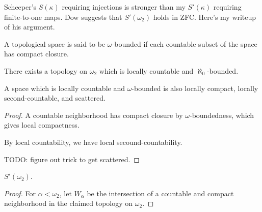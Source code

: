 \documentclass[11pt]{article}
\begin{document}
  \begin{remark}
    Scheeper's \(S(\kappa)\) requiring injections is stronger than my
    \(S'(\kappa)\) requiring finite-to-one maps. Dow suggests that
    \(S'(\omega_2)\) holds in ZFC. Here's my writeup of his argument.
  \end{remark}

  \begin{definition}
    A topological space is said to be \(\omega\)-bounded if each countable
    subset of the space has compact closure.
  \end{definition}

  \begin{claim*}
    There exists a topology on \(\omega_2\) which is locally countable
    and \(\aleph_0\)-bounded.
  \end{claim*}

  \begin{proposition}
    A space which is locally countable and \(\omega\)-bounded is also
    locally compact, locally second-countable, and scattered.
  \end{proposition}

  \begin{proof}
    A countable neighborhood has compact closure by \(\omega\)-boundedness,
    which gives local compactness.

    By local countability, we have local secound-countability.

    TODO: figure out trick to get scattered.
  \end{proof}

  \begin{theorem*}
    \(S'(\omega_2)\).
  \end{theorem*}

  \begin{proof}
    For \(\alpha<\omega_2\), let \(W_\alpha\) be the
    intersection of a countable and compact neighborhood in the claimed topology
    on \(\omega_2\).
  \end{proof}
\end{document}
